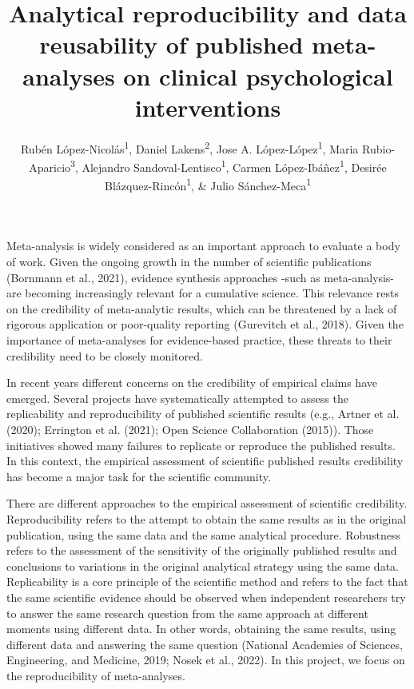 \documentclass[
  ,apa7,floatsintext]{apa6}
\title{Analytical reproducibility and data reusability of published meta-analyses on clinical psychological interventions}
\author{Rubén López-Nicolás\textsuperscript{1}, Daniel Lakens\textsuperscript{2}, Jose A. López-López\textsuperscript{1}, Maria Rubio-Aparicio\textsuperscript{3}, Alejandro Sandoval-Lentisco\textsuperscript{1}, Carmen López-Ibáñez\textsuperscript{1}, Desirée Blázquez-Rincón\textsuperscript{1}, \& Julio Sánchez-Meca\textsuperscript{1}}
\date{}
\affiliation{\vspace{0.5cm}\textsuperscript{1} University of Murcia, Spain\\\textsuperscript{2} Eindhoven University of Technology, The Netherlands\\\textsuperscript{3} University of Alicante, Spain}
\begin{document}
\maketitle

Meta-analysis is widely considered as an important approach to evaluate a body of work. Given the ongoing growth in the number of scientific publications (Bornmann et al., 2021), evidence synthesis approaches -such as meta-analysis- are becoming increasingly relevant for a cumulative science. This relevance rests on the credibility of meta-analytic results, which can be threatened by a lack of rigorous application or poor-quality reporting (Gurevitch et al., 2018). Given the importance of meta-analyses for evidence-based practice, these threats to their credibility need to be closely monitored.

In recent years different concerns on the credibility of empirical claims have emerged. Several projects have systematically attempted to assess the replicability and reproducibility of published scientific results (e.g., Artner et al. (2020); Errington et al. (2021); Open Science Collaboration (2015)). Those initiatives showed many failures to replicate or reproduce the published results. In this context, the empirical assessment of scientific published results credibility has become a major task for the scientific community.

There are different approaches to the empirical assessment of scientific credibility. Reproducibility refers to the attempt to obtain the same results as in the original publication, using the same data and the same analytical procedure. Robustness refers to the assessment of the sensitivity of the originally published results and conclusions to variations in the original analytical strategy using the same data. Replicability is a core principle of the scientific method and refers to the fact that the same scientific evidence should be observed when independent researchers try to answer the same research question from the same approach at different moments using different data. In other words, obtaining the same results, using different data and answering the same question (National Academies of Sciences, Engineering, and Medicine, 2019; Nosek et al., 2022). In this project, we focus on the reproducibility of meta-analyses.
\end{document}
